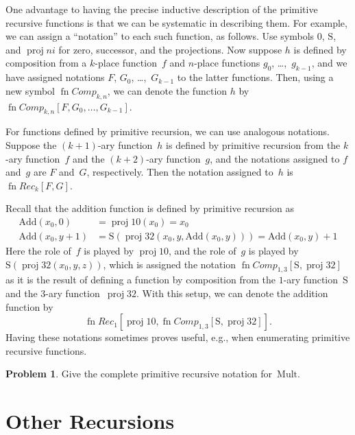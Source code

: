 \documentclass[10pt,a4paper]{article}
\theoremstyle{plain}
\theoremstyle{definition}
\newtheorem{prob}{Problem}[section]
\theoremstyle{remark}
\newcommand*{\olfileid}[3]{}
\newcommand*{\olsection}[1]{\section*{#1}}
\providecommand{\Mult}{\ensuremath{\mathrm{Mult}}}
\providecommand{\Add}{\ensuremath{\mathrm{Add}}}
\providecommand{\Zero}{\ensuremath{0}}
\providecommand{\Succ}{\ensuremath{\mathrm{S}}}
\providecommand{\Proj}{\operatorname{proj}}
\providecommand{\fn}{\operatorname{fn}}
\providecommand{\fn}{\operatorname{fn}}
\begin{document}
One advantage to having the precise inductive description of the primitive
recursive functions is that we can be systematic in describing them.
For example, we can assign a ``notation'' to each such function, as
follows. Use symbols $\Zero$, $\Succ$, and $\Proj{n}{i}$ for zero,
successor, and the projections. Now suppose $h$ is defined by
composition from a $k$-place function~$f$ and $n$-place functions $g_0$,
\dots,~$g_{k-1}$, and we have assigned notations $F$, $G_0$,
\dots,~$G_{k-1}$ to the latter functions. Then, using a new symbol
$\fn{Comp}_{k,n}$, we can denote the function $h$ by
$\fn{Comp}_{k,n}[F,G_0,\dots,G_{k-1}]$. 

For functions defined by primitive recursion, we can use analogous
notations. Suppose the $(k+1)$-ary function~$h$ is defined by
primitive recursion from the $k$-ary function~$f$ and the $(k+2)$-ary
function~$g$, and the notations assigned to $f$ and~$g$ are $F$
and~$G$, respectively. Then the notation assigned to~$h$ is
$\fn{Rec}_k[F,G]$. 

Recall that the addition function is defined by primitive recursion as
\begin{align*}
  \Add(x_0, 0) & = \Proj{1}{0}(x_0) = x_0\\
  \Add(x_0, y+1) & = \Succ(\Proj{3}{2}(x_0, y, \Add(x_0, y))) = \Add(x_0, y) +1
\end{align*}
Here the role of~$f$ is played by $\Proj{1}{0}$, and the role of~$g$
is played by $\Succ(\Proj{3}{2}(x_0, y, z))$, which is assigned the
notation $\fn{Comp}_{1,3}[\Succ,\Proj{3}{2}]$ as it is the result of
defining a function by composition from the $1$-ary function~$\Succ$
and the $3$-ary function~$\Proj{3}{2}$. With this setup, we can denote
the addition function by
\[
\fn{Rec}_1[\Proj{1}{0},\fn{Comp}_{1,3}[\Succ,\Proj{3}{2}]].
\]
Having these notations sometimes proves useful, e.g., when enumerating
primitive recursive functions.

\begin{prob}
  Give the complete primitive recursive notation for~$\Mult$.
\end{prob}





\olfileid{cmp}{rec}{ore}
\olsection{Other Recursions}
\end{document}
